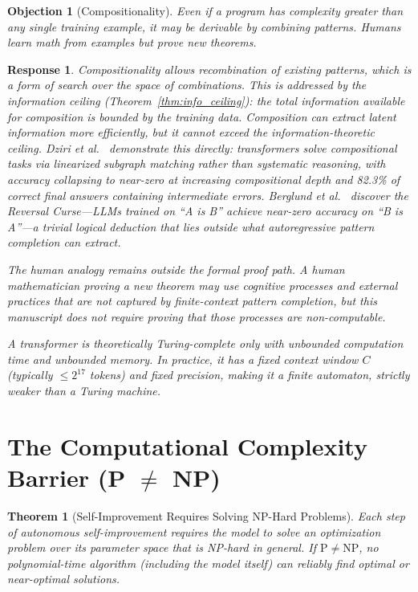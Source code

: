 \documentclass[11pt,a4paper]{article}
\newtheorem{theorem}{Theorem}[section]
\newtheorem{objection}{Objection}
\newtheorem{response}{Response}
\begin{document}
\begin{objection}[Compositionality]
Even if a program has complexity greater than any single training example, it may be derivable by combining patterns. Humans learn math from examples but prove new theorems.
\end{objection}

\begin{response}
Compositionality allows \emph{recombination} of existing patterns, which is a form of search over the space of combinations. This is addressed by the information ceiling (Theorem~\ref{thm:info_ceiling}): the total information available for composition is bounded by the training data. Composition can extract latent information more efficiently, but it cannot exceed the information-theoretic ceiling. Dziri et al.~\cite{dziri2023faith} demonstrate this directly: transformers solve compositional tasks via linearized subgraph matching rather than systematic reasoning, with accuracy collapsing to near-zero at increasing compositional depth and 82.3\% of correct final answers containing intermediate errors. Berglund et al.~\cite{berglund2023reversal} discover the Reversal Curse---LLMs trained on ``A is B'' achieve near-zero accuracy on ``B is A''---a trivial logical deduction that lies outside what autoregressive pattern completion can extract.

The human analogy remains outside the formal proof path. A human mathematician proving a new theorem may use cognitive processes and external practices that are not captured by finite-context pattern completion, but this manuscript does not require proving that those processes are non-computable.

A transformer is \emph{theoretically} Turing-complete only with unbounded computation time and unbounded memory. In practice, it has a fixed context window $C$ (typically $\leq 2^{17}$ tokens) and fixed precision, making it a finite automaton, strictly weaker than a Turing machine.
\end{response}

\section{The Computational Complexity Barrier (P $\neq$ NP)}

\begin{theorem}[Self-Improvement Requires Solving NP-Hard Problems]
\label{thm:pnp}
Each step of autonomous self-improvement requires the model to solve an optimization problem over its parameter space that is NP-hard in general. If $\mathrm{P} \neq \mathrm{NP}$, no polynomial-time algorithm (including the model itself) can reliably find optimal or near-optimal solutions.
\end{theorem}
\end{document}
